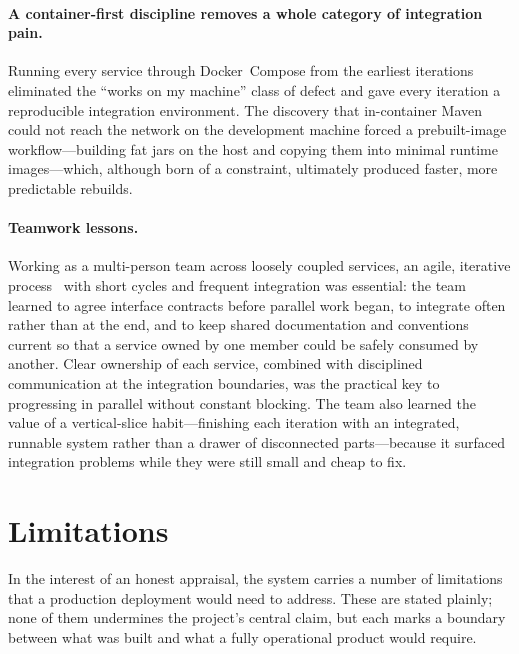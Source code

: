 \paragraph{A container-first discipline removes a whole category of integration pain.}
Running every service through Docker~Compose from the earliest iterations~\cite{docker}
eliminated the ``works on my machine'' class of defect and gave every iteration a
reproducible integration environment. The discovery that in-container Maven could not reach
the network on the development machine forced a prebuilt-image workflow---building fat jars
on the host and copying them into minimal runtime images---which, although born of a
constraint, ultimately produced faster, more predictable rebuilds.

\paragraph{Teamwork lessons.}
Working as a multi-person team across loosely coupled services, an agile, iterative
process~\cite{agile} with short cycles and frequent integration was essential: the
team learned to agree interface contracts before parallel work began, to integrate often
rather than at the end, and to keep shared documentation and conventions current so that
a service owned by one member could be safely consumed by another. Clear ownership of
each service, combined with disciplined communication at the integration boundaries,
was the practical key to progressing in parallel without constant blocking. The team also
learned the value of a vertical-slice habit---finishing each iteration with an integrated,
runnable system rather than a drawer of disconnected parts---because it surfaced
integration problems while they were still small and cheap to fix.

\section{Limitations}
\label{sec:limitations}

In the interest of an honest appraisal, the system carries a number of limitations that a
production deployment would need to address. These are stated plainly; none of them
undermines the project's central claim, but each marks a boundary between what was built and
what a fully operational product would require.


